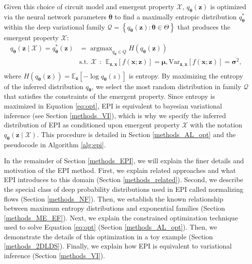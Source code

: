 \documentclass[11pt]{article}
\DeclareMathOperator*{\argmax}{argmax}
\begin{document}
Given this choice of circuit model and emergent property $\mathcal{X}$, $q_{\bm{\theta}}(\mathbf{z})$ is optimized via the neural network parameters $\bm{\theta}$ to find a maximally entropic distribution $q_{\bm{\theta}}^*$ within the deep variational family $\mathcal{Q} = \left\{ q_{\bm{\theta}}(\mathbf{z}) : \bm{\theta} \in \Theta \right\}$ that produces the emergent property $\mathcal{X}$:
\begin{equation} \label{eq:opt}
\begin{split}
q_{\bm{\theta}}(\mathbf{z} \mid \mathcal{X}) = q_{\bm{\theta}}^*(\mathbf{z}) &= \argmax_{q_{\bm{\theta}} \in Q} H(q_{\bm{\theta}}(\mathbf{z})) \\
 &  \text{s.t.  } \mathcal{X} ~~:~~ \mathbb{E}_{\mathbf{z},\mathbf{x}}\left[f(\mathbf{x}; \mathbf{z})\right] = \bm{\mu}, \text{Var}_{\mathbf{z},\mathbf{x}}\left[f(\mathbf{x}; \mathbf{z})\right] = \bm{\sigma}^2, \\
 \end{split}
\end{equation} 
where $H(q_{\bm{\theta}}(\mathbf{z})) = \mathbb{E}_{\mathbf{z}}\left[- \log q_{\bm{\theta}}(z) \right]$ is entropy.
By maximizing the entropy of the inferred distribution $q_{\bm{\theta}}$, we select the most random distribution in family $\mathcal{Q}$ that satisfies the constraints of the emergent property.
Since entropy is maximized in Equation \ref{eq:opt}, EPI is equivalent to bayesian variational inference (see Section \ref{methods_VI}), which is why we specify the inferred distribution of EPI as conditioned upon emergent property $\mathcal{X}$ with the notation $q_{\bm{\theta}}(\mathbf{z} \mid \mathcal{X})$.
This procedure is detailed in Section \ref{methods_AL_opt} and the pseudocode in Algorithm \ref{alg:epi}.

In the remainder of Section \ref{methods_EPI}, we will explain the finer details and motivation of the EPI method. 
First, we explain related approaches and what EPI introduces to this domain (Section \ref{methods_related}).
Second, we describe the special class of deep probability distributions used in EPI called normalizing flows (Section \ref{methods_NF}).
Then, we establish the known relationship between maximum entropy distributions and exponential families (Section \ref{methods_ME_EF}).
Next, we explain the constrained optimization technique used to solve Equation \ref{eq:opt} (Section \ref{methods_AL_opt}).
Then, we demonstrate the details of this optimization in a toy example (Section \ref{methods_2DLDS}).
Finally, we explain how EPI is equivalent to variational inference (Section \ref{methods_VI}).
\end{document}
